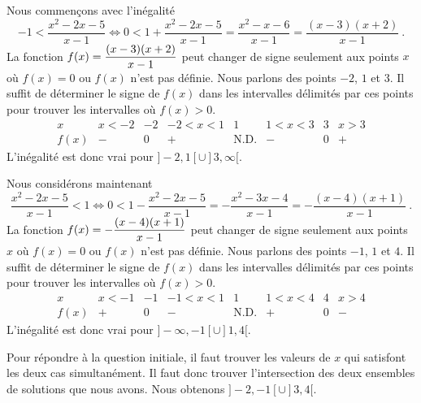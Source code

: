 { Nous commençons avec l'inégalité
\[
  -1 < \frac{x^2-2x - 5}{x-1} \Leftrightarrow
  0 < 1 + \frac{x^2-2x - 5}{x-1} = \frac{x^2 -x - 6}{x-1}
  = \frac{(x-3)(x+2)}{x-1} \ .
\]
La fonction $\displaystyle f(x) = \frac{(x-3)(x+2)}{x-1}$ peut
changer de signe seulement aux points $x$ où $f(x) = 0$ ou $f(x)$ n'est
pas définie.  Nous parlons des points $-2$, $1$ et $3$.  Il
suffit de déterminer le signe de $f(x)$ dans les intervalles
délimités par ces points pour trouver les intervalles où $f(x) > 0$.
\[
\begin{array}{c|c|c|c|c|c|c|c}
x & x < -2 & -2 & -2 < x <1 & 1 & 1 < x < 3 & 3 & x > 3 \\
\hline
f(x) & - & 0 & + & \text{N.D.} & - & 0 & + 
\end{array}
\]
L'inégalité est donc vrai pour $]-2, 1[ \cup ]3,\infty[$.

 Nous considérons maintenant
\[
 \frac{x^2-2x - 5}{x-1} < 1 \Leftrightarrow
  0 < 1 - \frac{x^2-2x - 5}{x-1} = -\frac{x^2 - 3x - 4}{x-1}
  = -\frac{(x-4)(x+1)}{x-1} \ .
\]
La fonction $\displaystyle f(x) = -\frac{(x-4)(x+1)}{x-1}$ peut
changer de signe seulement aux points $x$ où $f(x) = 0$ ou $f(x)$ n'est
pas définie.  Nous parlons des points $-1$, $1$ et $4$.  Il
suffit de déterminer le signe de $f(x)$ dans les intervalles
délimités par ces points pour trouver les intervalles où $f(x) > 0$.
\[
\begin{array}{c|c|c|c|c|c|c|c}
x & x < -1 & -1 & -1 < x <1 & 1 & 1 < x < 4 & 4 & x > 4 \\
\hline
f(x) & + & 0 & - & \text{N.D.} & + & 0 & - 
\end{array}
\]
L'inégalité est donc vrai pour $]-\infty, -1[ \cup ]1,4[$.

Pour répondre à la question initiale, il faut trouver les valeurs de
$x$ qui satisfont les deux cas simultanément.  Il faut donc trouver
l'intersection des deux ensembles de solutions que nous avons.
Nous obtenons $]-2, -1[ \cup ]3,4[$.
}



